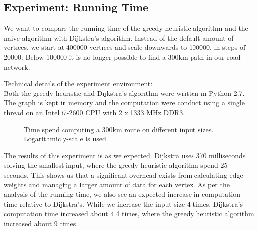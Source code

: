 \subsection{Experiment: Running Time}
We want to compare the running time of the greedy heuristic algorithm and the naive algorithm  with Dijkstra's algorithm. Instead of the default amount of vertices, we start at 400000 vertices and scale downwards to 100000, in steps of 20000. Below 100000 it is no longer possible to find a 300km path in our road network.

Technical details of the experiment environment:\\
Both the greedy heuristic and Dijkstra's algorithm were written in Python 2.7. The graph is kept in memory and the computation were conduct using a single thread on an Intel i7-2600 CPU with 2 x 1333 MHz DDR3.
\begin{figure}[!htb]
\centering
{}
\caption{Time spend computing a 300km route on different input sizes. Logarithmic y-scale is used} 
\label{fig:time_comp}
\end{figure}

The results of this experiment is as we expected. Dijkstra uses 370 milliseconds solving the smallest input, where the greedy heuristic algorithm spend 25 seconds. This shows us that a significant overhead exists from calculating edge weights and managing a larger amount of data for each vertex. As per the analysis of the running time, we also see an expected increase in computation time relative to Dijkstra's. While we increase the input size 4 times, Dijkstra's computation time increased about 4.4 times, where the greedy heuristic algorithm increased about 9 times.

